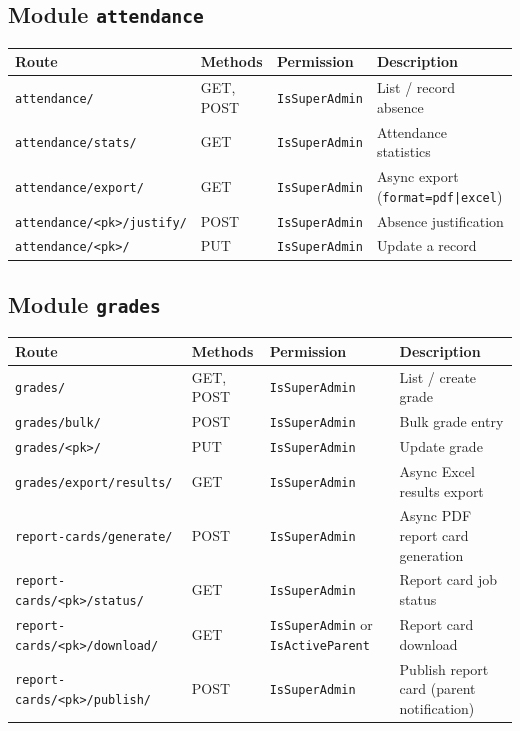\documentclass[11pt,a4paper]{article}
\begin{document}
\subsection{Module \texttt{attendance}}

\begin{longtable}{@{}lllp{5.5cm}@{}}
\toprule
\textbf{Route} & \textbf{Methods} & \textbf{Permission} & \textbf{Description} \\
\midrule
\endhead
\texttt{attendance/} & GET, POST & \texttt{IsSuperAdmin} & List / record absence \\
\texttt{attendance/stats/} & GET & \texttt{IsSuperAdmin} & Attendance statistics \\
\texttt{attendance/export/} & GET & \texttt{IsSuperAdmin} & Async export (\texttt{format=pdf|excel}) \\
\texttt{attendance/<pk>/justify/} & POST & \texttt{IsSuperAdmin} & Absence justification \\
\texttt{attendance/<pk>/} & PUT & \texttt{IsSuperAdmin} & Update a record \\
\bottomrule
\end{longtable}

\subsection{Module \texttt{grades}}

\begin{longtable}{@{}lllp{5.5cm}@{}}
\toprule
\textbf{Route} & \textbf{Methods} & \textbf{Permission} & \textbf{Description} \\
\midrule
\endhead
\texttt{grades/} & GET, POST & \texttt{IsSuperAdmin} & List / create grade \\
\texttt{grades/bulk/} & POST & \texttt{IsSuperAdmin} & Bulk grade entry \\
\texttt{grades/<pk>/} & PUT & \texttt{IsSuperAdmin} & Update grade \\
\texttt{grades/export/results/} & GET & \texttt{IsSuperAdmin} & Async Excel results export \\
\texttt{report-cards/generate/} & POST & \texttt{IsSuperAdmin} & Async PDF report card generation \\
\texttt{report-cards/<pk>/status/} & GET & \texttt{IsSuperAdmin} & Report card job status \\
\texttt{report-cards/<pk>/download/} & GET & \texttt{IsSuperAdmin} or \texttt{IsActiveParent} & Report card download \\
\texttt{report-cards/<pk>/publish/} & POST & \texttt{IsSuperAdmin} & Publish report card (parent notification) \\
\bottomrule
\end{longtable}
\end{document}
